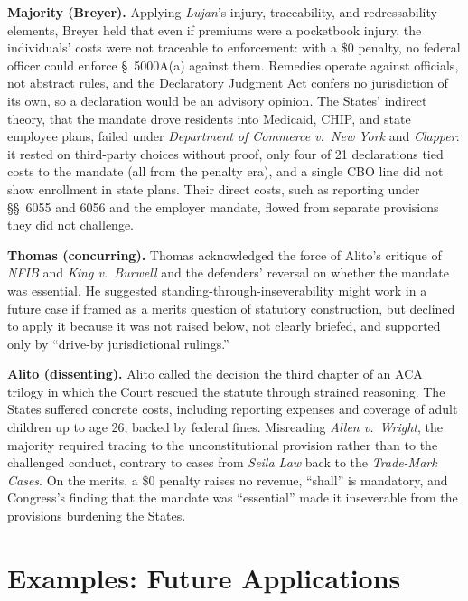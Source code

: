 \documentclass[12pt]{article}
\begin{document}
\textbf{Majority (Breyer).} Applying \textit{Lujan}'s injury, traceability, and redressability elements, Breyer held that even if premiums were a pocketbook injury, the individuals' costs were not traceable to enforcement: with a \$0 penalty, no federal officer could enforce \S\ 5000A(a) against them. Remedies operate against officials, not abstract rules, and the Declaratory Judgment Act confers no jurisdiction of its own, so a declaration would be an advisory opinion. The States' indirect theory, that the mandate drove residents into Medicaid, CHIP, and state employee plans, failed under \textit{Department of Commerce v.\ New York} and \textit{Clapper}: it rested on third-party choices without proof, only four of 21 declarations tied costs to the mandate (all from the penalty era), and a single CBO line did not show enrollment in state plans. Their direct costs, such as reporting under \S\S\ 6055 and 6056 and the employer mandate, flowed from separate provisions they did not challenge.

\textbf{Thomas (concurring).} Thomas acknowledged the force of Alito's critique of \textit{NFIB} and \textit{King v.\ Burwell} and the defenders' reversal on whether the mandate was essential. He suggested standing-through-inseverability might work in a future case if framed as a merits question of statutory construction, but declined to apply it because it was not raised below, not clearly briefed, and supported only by ``drive-by jurisdictional rulings.''

\textbf{Alito (dissenting).} Alito called the decision the third chapter of an ACA trilogy in which the Court rescued the statute through strained reasoning. The States suffered concrete costs, including reporting expenses and coverage of adult children up to age 26, backed by federal fines. Misreading \textit{Allen v.\ Wright}, the majority required tracing to the unconstitutional provision rather than to the challenged conduct, contrary to cases from \textit{Seila Law} back to the \textit{Trade-Mark Cases}. On the merits, a \$0 penalty raises no revenue, ``shall'' is mandatory, and Congress's finding that the mandate was ``essential'' made it inseverable from the provisions burdening the States.

\section{Examples: Future Applications}
\end{document}
